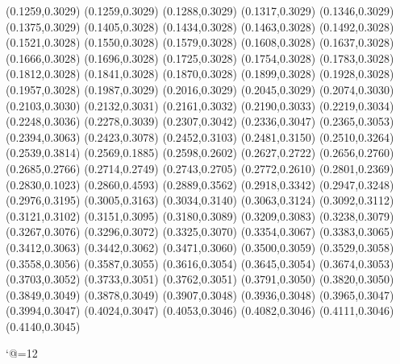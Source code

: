 \PST@Solid(0.1259,0.3029)
(0.1259,0.3029)
(0.1288,0.3029)
(0.1317,0.3029)
(0.1346,0.3029)
(0.1375,0.3029)
(0.1405,0.3028)
(0.1434,0.3028)
(0.1463,0.3028)
(0.1492,0.3028)
(0.1521,0.3028)
(0.1550,0.3028)
(0.1579,0.3028)
(0.1608,0.3028)
(0.1637,0.3028)
(0.1666,0.3028)
(0.1696,0.3028)
(0.1725,0.3028)
(0.1754,0.3028)
(0.1783,0.3028)
(0.1812,0.3028)
(0.1841,0.3028)
(0.1870,0.3028)
(0.1899,0.3028)
(0.1928,0.3028)
(0.1957,0.3028)
(0.1987,0.3029)
(0.2016,0.3029)
(0.2045,0.3029)
(0.2074,0.3030)
(0.2103,0.3030)
(0.2132,0.3031)
(0.2161,0.3032)
(0.2190,0.3033)
(0.2219,0.3034)
(0.2248,0.3036)
(0.2278,0.3039)
(0.2307,0.3042)
(0.2336,0.3047)
(0.2365,0.3053)
(0.2394,0.3063)
(0.2423,0.3078)
(0.2452,0.3103)
(0.2481,0.3150)
(0.2510,0.3264)
(0.2539,0.3814)
(0.2569,0.1885)
(0.2598,0.2602)
(0.2627,0.2722)
(0.2656,0.2760)
(0.2685,0.2766)
(0.2714,0.2749)
(0.2743,0.2705)
(0.2772,0.2610)
(0.2801,0.2369)
(0.2830,0.1023)
(0.2860,0.4593)
(0.2889,0.3562)
(0.2918,0.3342)
(0.2947,0.3248)
(0.2976,0.3195)
(0.3005,0.3163)
(0.3034,0.3140)
(0.3063,0.3124)
(0.3092,0.3112)
(0.3121,0.3102)
(0.3151,0.3095)
(0.3180,0.3089)
(0.3209,0.3083)
(0.3238,0.3079)
(0.3267,0.3076)
(0.3296,0.3072)
(0.3325,0.3070)
(0.3354,0.3067)
(0.3383,0.3065)
(0.3412,0.3063)
(0.3442,0.3062)
(0.3471,0.3060)
(0.3500,0.3059)
(0.3529,0.3058)
(0.3558,0.3056)
(0.3587,0.3055)
(0.3616,0.3054)
(0.3645,0.3054)
(0.3674,0.3053)
(0.3703,0.3052)
(0.3733,0.3051)
(0.3762,0.3051)
(0.3791,0.3050)
(0.3820,0.3050)
(0.3849,0.3049)
(0.3878,0.3049)
(0.3907,0.3048)
(0.3936,0.3048)
(0.3965,0.3047)
(0.3994,0.3047)
(0.4024,0.3047)
(0.4053,0.3046)
(0.4082,0.3046)
(0.4111,0.3046)
(0.4140,0.3045)

\catcode`@=12
\fi
\endpspicture
